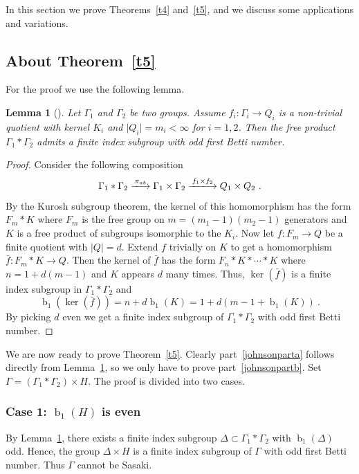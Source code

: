 \documentclass[12pt,leqno]{amsart}
\newcommand{\lra}{\longrightarrow}
\newcommand{\betti}{{\operatorname{b}}}
\newtheorem{lem}[theor]{Lemma}
\begin{document}
In this section we prove Theorems~\ref{t4} and~\ref{t5}, and we discuss some applications and variations. 

\subsection{About Theorem~\ref{t5}}
For the proof we use the following lemma.
\begin{lem}[\cite{KotAIF}]\label{LemFinIndSubgroup}
	Let $\Gamma_1$ and $\Gamma_2$ be two groups. Assume $f_i\colon \Gamma_i\lra Q_i$ is a non-trivial quotient with  kernel $K_i$ and $\vert Q_i\vert=m_i<\infty$ for $i=1,2$. Then the free product $\Gamma_1*\Gamma_2$ admits a finite index subgroup with odd first Betti number.
\end{lem}
\begin{proof}
	Consider the following composition
	$$
	\Gamma_1*\Gamma_2\xlongrightarrow{\pi_{ab}}\Gamma_1\times\Gamma_2\xlongrightarrow{f_1\times f_2}Q_1\times Q_2\ .
	$$
	By the Kurosh subgroup theorem, the kernel of this homomorphism has the form $F_m* K$ where $F_m$ is the free group 
	on $m=(m_1-1)(m_2-1)$ generators and $K$ is a free product of subgroups isomorphic to the $K_i$.
	Now let $f\colon F_m\lra Q$ be a finite quotient with $\vert Q\vert= d$.
	Extend $f$ trivially on $K$ to get a homomorphism $\bar f\colon F_m* K\lra Q$.
	Then the kernel of $\bar f$ has the form $F_n* K*\cdots* K$ where $n=1+d(m-1)$ and $K$ appears $d$ many times.
	Thus, $\ker(\bar f)$ is a finite index subgroup in $\Gamma_1*\Gamma_2$ and 
	$$\betti_1(\ker(\bar f))=n+d\betti_1(K)=1+d(m-1+\betti_1(K))\ .$$
	By picking $d$ even we get a finite index subgroup of $\Gamma_1*\Gamma_2$ with odd first Betti number. 
\end{proof}


We are now ready to prove Theorem~\ref{t5}.
Clearly part~\eqref{johnsonparta} follows directly from Lemma~\ref{LemFinIndSubgroup}, so we only have to prove 
part~\eqref{johnsonpartb}. 
Set $\Gamma=(\Gamma_1*\Gamma_2)\times H$. The proof is divided into two cases.

\subsubsection*{Case 1: $\betti_1(H)$ is even}

By Lemma~\ref{LemFinIndSubgroup}, there exists a finite index subgroup $\Delta\subset\Gamma_1*\Gamma_2$ 
with $\betti_1(\Delta)$ odd.
Hence, the group $\Delta\times H$ is a finite index subgroup of $\Gamma$ with odd first Betti number. 
Thus $\Gamma$ cannot be Sasaki.
\end{document}
